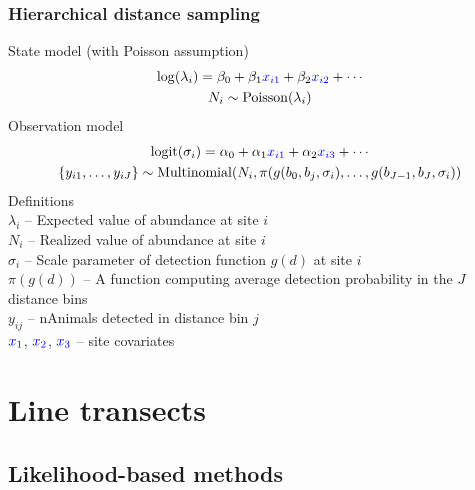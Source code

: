 \documentclass[color=usenames,dvipsnames]{beamer}\usepackage[]{graphicx}\usepackage[]{color}
\begin{document}
\begin{frame}
  \frametitle{Hierarchical distance sampling}
  \small
  State model (with Poisson assumption)
  \begin{gather*}
    \mathrm{log}(\lambda_i) = \beta_0 + \beta_1 {\color{blue} x_{i1}} +
    \beta_2 {\color{blue} x_{i2}} + \cdots \\
    N_i \sim \mathrm{Poisson}(\lambda_i)
  \end{gather*}
  \pause
  Observation model
  \begin{gather*}
    \mathrm{logit}(\sigma_{i}) = \alpha_0 + \alpha_1 {\color{blue} x_{i1}}
    + \alpha_2 {\color{blue} x_{i3}} + \cdots \\
    \{y_{i1}, \dots, y_{iJ}\}  \sim \mathrm{Multinomial}(N_i,
    \pi(g(b_0, b_j, \sigma_i), \dots, g(b_{J-1}, b_{J}, \sigma_i))
  \end{gather*}
  \pause
  \vfill
  \small
  Definitions \\
  $\lambda_i$ -- Expected value of abundance at site $i$ \\
  $N_i$ -- Realized value of abundance at site $i$ \\
  $\sigma_{i}$ -- Scale parameter of detection function $g(d)$ at site $i$ \\
  $\pi(g(d))$ -- A function computing average detection probability in
  the $J$ distance bins \\
  $y_{ij}$ -- nAnimals detected in distance bin $j$ \\
  $\color{blue} x_1$, $\color{blue} x_2$, $\color{blue} x_3$ -- site covariates %
\end{frame}













\section{Line transects}

\subsection{Likelihood-based methods}
\end{document}
